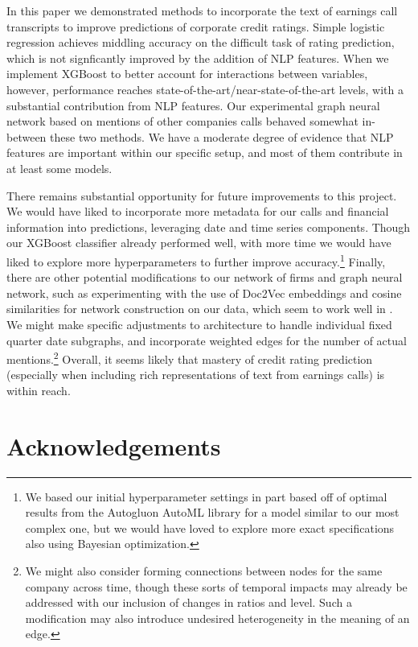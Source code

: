 \documentclass{article}[11pt]
\begin{document}
    In this paper we demonstrated methods to incorporate the text of earnings call transcripts to improve predictions of corporate credit ratings. Simple logistic regression achieves middling accuracy on the difficult task of rating prediction, which is not signficantly improved by the addition of NLP features. When we implement XGBoost to better account for interactions between variables, however, performance reaches state-of-the-art/near-state-of-the-art levels, with a substantial contribution from NLP features. Our experimental graph neural network based on mentions of other companies calls behaved somewhat in-between these two methods. We have a moderate degree of evidence that NLP features are important within our specific setup, and most of them contribute in at least some models.

    There remains substantial opportunity for future improvements to this project. We would have liked to incorporate more metadata for our calls and financial information into predictions, leveraging date and time series components. Though our XGBoost classifier already performed well, with more time we would have liked to explore more hyperparameters to further improve accuracy.\footnote{We based our initial hyperparameter settings in part based off of optimal results from the Autogluon AutoML library \citep{erickson_autogluon_2024} for a model similar to our most complex one, but we would have loved to explore more exact specifications also using Bayesian optimization.} Finally, there are other potential modifications to our network of firms and graph neural network, such as experimenting with the use of Doc2Vec embeddings and cosine similarities for network construction on our data, which seem to work well in \cite{das_credit_2023}. We might make specific adjustments to architecture to handle individual fixed quarter date subgraphs, and incorporate weighted edges for the number of actual mentions.\footnote{We might also consider forming connections between nodes for the same company across time, though these sorts of temporal impacts may already be addressed with our inclusion of changes in ratios and level. Such a modification may also introduce undesired heterogeneity in the meaning of an edge.} Overall, it seems likely that mastery of credit rating prediction (especially when including rich representations of text from earnings calls) is within reach.

    \section*{Acknowledgements}
\end{document}
